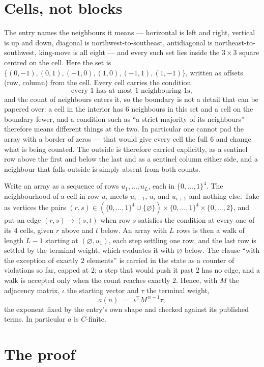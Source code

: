 \documentclass[11pt,a4paper]{article}
\theoremstyle{plain}
\theoremstyle{definition}
\begin{document}
\section{Cells, not blocks}

The entry names the neighbours it means --- horizontal is left and right, vertical is up and
down, diagonal is northwest-to-southeast, antidiagonal is northeast-to-southwest, king-move is
all eight --- and every such set lies inside the $3\times3$ square centred on the cell. Here
the set is $\{(0,-1), (0,1), (-1,0), (1,0), (-1,1), (1,-1)\}$, written as offsets (row, column) from the cell. Every cell carries
the condition
\[
\text{every 1 has at most 1 neighbouring 1s},
\]
and the count of neighbours enters it, so the boundary is not a detail that can be papered
over: a cell in the interior has $6$ neighbours in this set and a cell on the boundary
fewer, and a condition such as ``a strict majority of its neighbours'' therefore means
different things at the two. In particular one cannot pad the array with a border of zeros ---
that would give every cell the full $6$ and change what is being counted. The outside is
therefore carried
explicitly, as a sentinel row above the first and below the last and as a sentinel column
either side, and a neighbour that falls outside is simply absent from both counts.

Write an array as a sequence of rows $u_1,\dots,u_L$, each in
$\{0,\dots,1\}^{4}$. The neighbourhood of a cell in row $u_i$ meets $u_{i-1}$,
$u_i$ and $u_{i+1}$ and nothing else. Take as vertices the pairs
$(r,s)\in(\{0,\dots,1\}^{4}\cup\{\varnothing\})\times\{0,\dots,1\}^{4} \times \{0,\dots,2\}$,
and put an edge $(r,s)\to(s,t)$ when row $s$ satisfies the condition at every one of its
$4$ cells, given $r$ above and $t$ below. An array with $L$ rows is then a walk of length
$L-1$ starting at $(\varnothing,u_1)$, each step settling one row, and the last row is
settled by the terminal weight, which evaluates it with $\varnothing$ below. The clause ``with the exception of exactly $2$ elements'' is carried in
the state as a counter of violations so far, capped at $2$; a step that would push it past
$2$ has no edge, and a walk is accepted only when the count reaches exactly $2$. Hence,
with $M$ the adjacency matrix, $\iota$ the starting vector and $\tau$ the terminal weight,
\[
a(n)\;=\;\,\iota^{\!\top}M^{\,n-1}\tau ,
\]
the exponent fixed by the entry's own shape and checked against its published terms. In
particular $a$ is $C$-finite.

\section{The proof}
\end{document}
